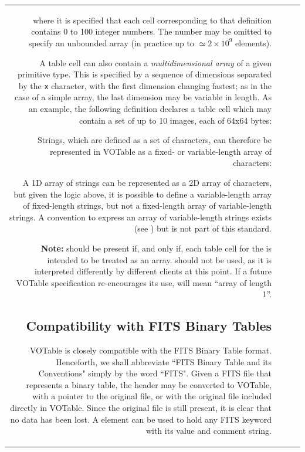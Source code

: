 \begin{tabular}{RRCp{0.8\textwidth}}
\begin{center}

\noindent where it is specified that each cell corresponding to that 
  definition contains 0 to 100 integer numbers. The number may be 
  omitted to specify an unbounded array
  (in practice up to $\simeq 2\times10^9$ elements).

A table cell can also contain a {\em multidimensional array} 
of a given primitive type. This is specified by a sequence of dimensions
separated by the {\tt x} character, 
with the first dimension changing fastest; as in the case
of a simple array, the last dimension may be variable in length.
As an example, the following definition
declares a table cell which may contain a set of up to 10 images,
each of 64x64 bytes:


Strings, which are defined as a set of characters,
can therefore be represented in VOTable as a fixed- or variable-length 
array of characters:


A 1D array of strings can be represented as a 2D array of characters, but
given the logic above, it is possible to define a variable-length array
of fixed-length strings,
but not a fixed-length array of variable-length strings.
A convention to express an array of variable-length strings
exists (see ) but is not
part of this standard.

\textbf{Note:}  should be present if, and only if, each table
cell for the  is intended to be treated as an array. 
should not be used, as it is interpreted differently by different
clients at this point. If a future VOTable specification re-encourages
its use,  will mean ``array of length 1''.

\subsection{Compatibility with FITS Binary Tables}

VOTable is closely compatible with the FITS Binary Table format.
Henceforth, we shall abbreviate ``FITS Binary Table  and its
Conventions" simply by the word ``FITS". Given a FITS
file that represents a binary table, the header may be converted to
VOTable, with a pointer to the original file, or with the original
file included directly in VOTable. Since the original file is still
present, it is clear that no data has been lost. A {}
element can be used to hold any FITS keyword with its value
and comment string.


\end{center}
\end{tabular}
